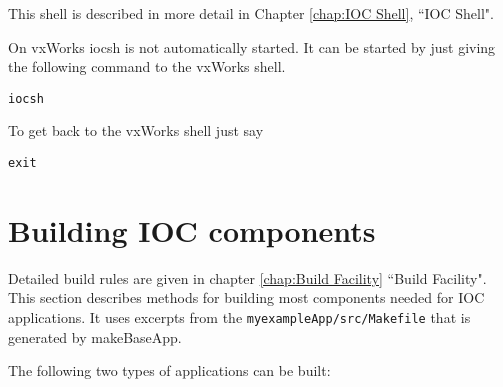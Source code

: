 This shell is described in more detail in Chapter \ref{chap:IOC Shell}, ``IOC Shell".

On vxWorks iocsh is not automatically started.
It can be started by just giving the following command to the vxWorks shell.

\begin{verbatim}
iocsh
\end{verbatim}
To get back to the vxWorks shell just say

\begin{verbatim}
exit
\end{verbatim}

\section{Building IOC components}

Detailed build rules are given in chapter \ref{chap:Build Facility} ``Build Facility".
This section describes methods for building most components needed for IOC applications.
It uses excerpts from the \verb|myexampleApp/src/Makefile| that is generated by 
makeBaseApp.

The following two types of applications can be built:

